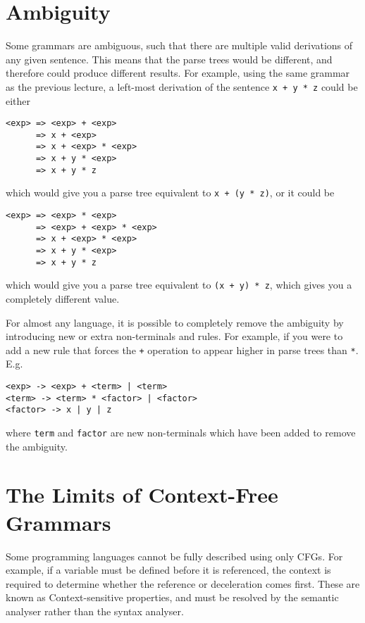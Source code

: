 
\section*{Ambiguity}

Some grammars are ambiguous, such that there are multiple valid derivations of any given sentence. This means that the
 parse trees would be different, and therefore could produce different results. For example, using the same grammar as
 the previous lecture, a left-most derivation of the sentence \verb`x + y * z` could be either
\begin{verbatim}
<exp> => <exp> + <exp>
      => x + <exp>
      => x + <exp> * <exp>
      => x + y * <exp>
      => x + y * z
\end{verbatim}
which would give you a parse tree equivalent to \verb`x + (y * z)`, or it could be
\begin{verbatim}
<exp> => <exp> * <exp>
      => <exp> + <exp> * <exp>
      => x + <exp> * <exp>
      => x + y * <exp>
      => x + y * z
\end{verbatim}
which would give you a parse tree equivalent to \verb`(x + y) * z`, which gives you a completely different value.

For almost any language, it is possible to completely remove the ambiguity by introducing new or extra non-terminals
 and rules. For example, if you were to add a new rule that forces the \verb`+` operation to appear higher in parse
 trees than \verb`*`. E.g.
\begin{verbatim}
<exp> -> <exp> + <term> | <term>
<term> -> <term> * <factor> | <factor>
<factor> -> x | y | z
\end{verbatim}
where \verb`term` and \verb`factor` are new non-terminals which have been added to remove the ambiguity.

\section*{The Limits of Context-Free Grammars}

Some programming languages cannot be fully described using only CFGs. For example, if a variable must be defined before
 it is referenced, the context is required to determine whether the reference or deceleration comes first. These are 
 known as Context-sensitive properties, and must be resolved by the semantic analyser rather than the syntax analyser.

